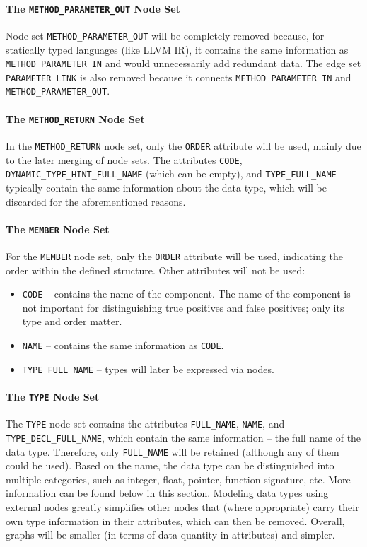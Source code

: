 \paragraph{The \texttt{METHOD\_PARAMETER\_OUT} Node Set}
Node set \texttt{METHOD\_PARAMETER\_OUT} will be completely removed because, for statically typed languages (like LLVM IR), it contains the same information as \texttt{METHOD\_PARAMETER\_IN} and would unnecessarily add redundant data. The edge set \texttt{PARAMETER\_LINK} is also removed because it connects \texttt{METHOD\_PARAMETER\_IN} and \texttt{METHOD\_PARAMETER\_OUT}.

\paragraph{The \texttt{METHOD\_RETURN} Node Set}
In the \texttt{METHOD\_RETURN} node set, only the \texttt{ORDER} attribute will be used, mainly due to the later merging of node sets. The attributes \texttt{CODE}, \texttt{DYNAMIC\_TYPE\_HINT\_FULL\_NAME} (which can be empty), and \texttt{TYPE\_FULL\_NAME} typically contain the same information about the data type, which will be discarded for the aforementioned reasons.

\paragraph{The \texttt{MEMBER} Node Set}
For the \texttt{MEMBER} node set, only the \texttt{ORDER} attribute will be used, indicating the order within the defined structure. Other attributes will not be used:
\begin{itemize}
    \item \texttt{CODE} -- contains the name of the component. The name of the component is not important for distinguishing true positives and false positives; only its type and order matter.
    \item \texttt{NAME} -- contains the same information as \texttt{CODE}.
    \item \texttt{TYPE\_FULL\_NAME} -- types will later be expressed via nodes.
\end{itemize}

\paragraph{The \texttt{TYPE} Node Set}
The \texttt{TYPE} node set contains the attributes \texttt{FULL\_NAME}, \texttt{NAME}, and \texttt{TYPE\_DECL\_FULL\_NAME}, which contain the same information -- the full name of the data type. Therefore, only \texttt{FULL\_NAME} will be retained (although any of them could be used). Based on the name, the data type can be distinguished into multiple categories, such as integer, float, pointer, function signature, etc. More information can be found below in this section. Modeling data types using external nodes greatly simplifies other nodes that (where appropriate) carry their own type information in their attributes, which can then be removed. Overall, graphs will be smaller (in terms of data quantity in attributes) and simpler.


